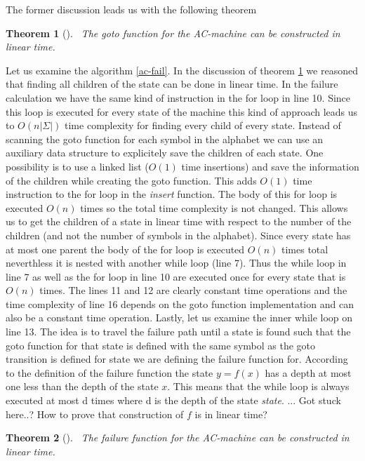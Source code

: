 \documentclass[english,twoside,censored,csm,algorithms-track-2020]{HYthesisML}
\theoremstyle{plain}
\newtheorem{theorem}{Theorem}[chapter]
\theoremstyle{definition}
\begin{document}
The former discussion leads us with the following theorem
\begin{theorem}[]~\label{thm-linear-goto}
The goto function for the AC-machine can be constructed in linear time.
\end{theorem}

Let us examine the algorithm \ref{ac-fail}. In the discussion of theorem
\ref{thm-linear-goto} we reasoned that finding all children of the state can be done in
linear time. In the failure calculation we have the same kind of instruction in the for loop
in line 10. Since this loop is executed for every state of the machine this kind of approach leads
us to $O(n|\Sigma|)$ time complexity for finding every child of every state. Instead of scanning
the goto function for each symbol in the alphabet we can use an auxiliary data structure to
explicitely save the children of each state. One possibility is to use a linked list ($O(1)$ time
insertions) and save the information of the children while creating the goto function. This adds
$O(1)$ time instruction to the for loop in the \textit{insert} function. The body of this for loop
is executed $O(n)$ times so the total time complexity is not changed. This allows us to get the
children of a state in linear time with respect to the number of the children (and not the number of
symbols in the alphabet). Since every state
has at most one parent the body of the for loop is executed $O(n)$ times total neverthless it
is nested with another while loop (line 7). Thus the while loop in line 7 as well as the for loop in
line 10 are executed once for every state that is $O(n)$ times. The lines 11 and 12 are clearly constant
time operations and the time complexity of line 16 depends on the goto function implementation and
can also be a constant time operation. Lastly, let us examine the inner while loop on line 13.
The idea is to travel the failure path until a state is found such that the goto function
for that state is defined with the same symbol as the goto transition is defined for state we are
defining the failure function for. According to the definition of the failure function the state
$y=f(x)$ has a depth at most one less than the depth of the state $x$. This means that the while
loop is always executed at most d times where d is the depth of the state \textit{state}.
... Got stuck here..? How to prove that construction of $f$ is in linear time?

\begin{theorem}[]~\label{thm-linear-failure}
The failure function for the AC-machine can be constructed in linear time.
\end{theorem}
\end{document}
